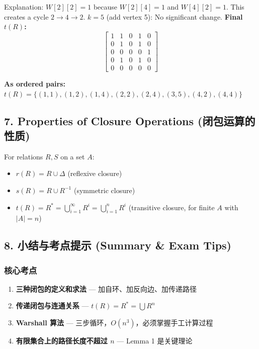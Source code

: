 \documentclass[10pt,a4paper,openany]{ctexbook}
\theoremstyle{definition}
\theoremstyle{remark}
\begin{document}
Explanation: $W[2][2] = 1$ because $W[2][4]=1$ and $W[4][2]=1$. This creates a cycle $2 \to 4 \to 2$.
\textbf{$k=5$} (add vertex 5):
No significant change.
\textbf{Final $t(R)$:}
\[
\begin{bmatrix}
1 & 1 & 0 & 1 & 0 \\
0 & 1 & 0 & 1 & 0 \\
0 & 0 & 0 & 0 & 1 \\
0 & 1 & 0 & 1 & 0 \\
0 & 0 & 0 & 0 & 0
\end{bmatrix}
\]

\textbf{As ordered pairs:}
$t(R) = \{(1,1), (1,2), (1,4), (2,2), (2,4), (3,5), (4,2), (4,4)\}$
\vspace{-2pt}

\subsection{7. Properties of Closure Operations (闭包运算的性质)}

For relations $R, S$ on a set $A$:
\begin{itemize}
\item $r(R) = R \cup \Delta$ (reflexive closure)
\item $s(R) = R \cup R^{-1}$ (symmetric closure)
\item $t(R) = R^* = \bigcup_{i=1}^\infty R^i = \bigcup_{i=1}^n R^i$ (transitive closure, for finite $A$ with $|A| = n$)

\end{itemize}

\vspace{-2pt}

\subsection{8. 小结与考点提示 (Summary \& Exam Tips)}

\subsubsection{核心考点}

\begin{enumerate}
\item \textbf{三种闭包的定义和求法} — 加自环、加反向边、加传递路径
\item \textbf{传递闭包与连通关系} — $t(R) = R^* = \bigcup R^n$
\item \textbf{Warshall 算法} — 三步循环，$O(n^3)$，必须掌握手工计算过程
\item \textbf{有限集合上的路径长度不超过 $n$} — Lemma 1 是关键理论

\end{enumerate}
\end{document}

